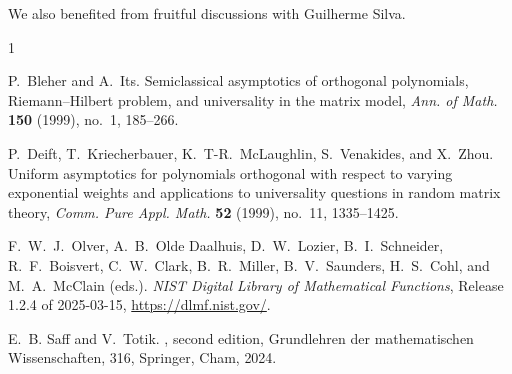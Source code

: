 \documentclass[reqno,11pt]{amsart}
\theoremstyle{plain}
\theoremstyle{definition}
\theoremstyle{remark}
\numberwithin{equation}{section}
\begin{document}
    We also benefited from fruitful discussions with Guilherme Silva. 
 



\def\cprime{$'$}
\begin{thebibliography}{1}
	
P.~Bleher and A.~Its.
Semiclassical asymptotics of orthogonal polynomials, {R}iemann--{H}ilbert
problem, and universality in the matrix model,
\textit{Ann. of Math.} \textbf{150} (1999), no.~1, 185--266.

P.~Deift, T.~Kriecherbauer, K.~T-R.~McLaughlin, S.~Venakides, 
and X.~Zhou.
Uniform asymptotics for polynomials orthogonal with respect to varying
exponential weights and applications to universality questions in random
matrix theory,
\textit{Comm. Pure Appl. Math.} \textbf{52} (1999), no.~11, 1335--1425.

F.~W.~J.~Olver,  A.~B.~Olde Daalhuis, D.~W.~Lozier,
 B.~I.~Schneider, R.~F.~Boisvert, C.~W.~Clark, B.~R.~Miller,
B.~V.~Saunders, H.~S.~Cohl, and  M.~A.~McClain (eds.).
\textit{NIST Digital Library of Mathematical Functions},
Release 1.2.4 of 2025-03-15,
\url{https://dlmf.nist.gov/}.

E.~B. Saff and V.~Totik.
, second edition, 
Grundlehren der mathematischen Wissenschaften, 316, Springer, Cham, 2024.

\end{thebibliography}
 
\end{document}
